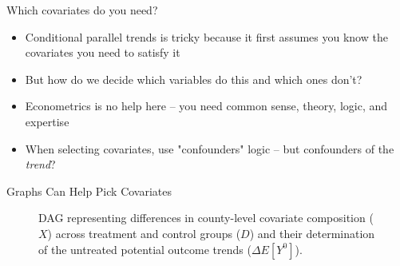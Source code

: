 \documentclass{beamer}
\begin{document}
\begin{frame}{Which covariates do you need?}

\begin{itemize}
\item Conditional parallel trends is tricky because it first assumes you know the covariates you need to satisfy it
\item But how do we decide which variables do this and which ones don't?
\item Econometrics is no help here -- you need common sense, theory, logic, and expertise
\item When selecting covariates, use "confounders" logic -- but confounders of the \emph{trend}?
\end{itemize}

\end{frame}




\begin{frame}{Graphs Can Help Pick Covariates}

\begin{figure}[h!]
    \centering
\caption{DAG representing differences in county-level covariate composition (\(X\)) across treatment and control groups (\(D\)) and their determination of the untreated potential outcome trends (\(\Delta E\left[Y^0\right]\)).}
\end{figure}

\end{frame}
\end{document}

